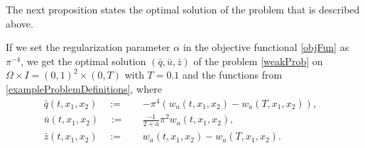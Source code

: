 The next proposition states the optimal solution of the problem that is described above.
\begin{prop}
If we set the regularization parameter $\alpha$ in the objective functional \eqref{objFun} as $\pi^{-4}$, we get the optimal solution $(\bar{q}, \bar{u}, \bar{z})$ of the problem \eqref{weakProb} on $\Omega\times I=(0,1)^2\times(0,T)$ with $T=0.1$ and the functions from \ref{exampleProblemDefinitions}, where
\begin{equation}
\label{analyticalSolution}
\begin{aligned}
\bar{q}(t,x_1,x_2)\quad:=\quad&-\pi^4\left(w_a(t,x_1,x_2)-w_a(T,x_1,x_2)\right),&\\
\bar{u}(t,x_1,x_2)\quad:=\quad&\frac{-1}{2+a}\pi^2w_a(t,x_1,x_2),&\\
\bar{z}(t,x_1,x_2)\quad:=\quad&w_a(t,x_1,x_2)-w_a(T,x_1,x_2).&
\end{aligned}
\end{equation}
\end{prop}
